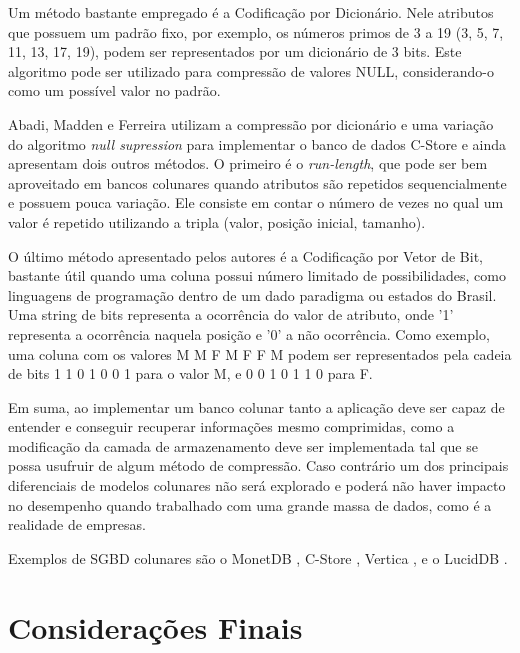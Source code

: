 Um método bastante empregado é a Codificação por Dicionário. Nele atributos que possuem um padrão fixo, por exemplo, os números primos de 
3 a 19 (3, 5, 7, 11, 13, 17, 19), podem ser representados por um dicionário de 3 bits. Este algoritmo pode ser utilizado para compressão 
de valores NULL, considerando-o como um possível valor no padrão.

Abadi, Madden e Ferreira \cite{abadi2006integrating} utilizam a compressão por dicionário e uma variação do algoritmo \textit{null supression} para implementar o banco de dados C-Store e ainda apresentam dois outros métodos. O primeiro é o \textit{run-length}, que pode ser bem aproveitado 
em bancos colunares quando atributos são repetidos sequencialmente e possuem pouca variação. Ele consiste em contar o número de vezes no qual 
um valor é repetido utilizando a tripla (valor, posição inicial, tamanho). 




O último método apresentado pelos autores é a Codificação por Vetor de Bit, bastante útil quando uma coluna possui número limitado 
de possibilidades, como linguagens de programação dentro de um dado paradigma ou estados do Brasil. Uma string de bits representa a 
ocorrência do valor de atributo, onde '1' representa a ocorrência naquela posição e '0' a não ocorrência. Como exemplo, uma coluna com os 
valores {M M F M F F M} podem ser representados pela cadeia de bits 1 1 0 1 0 0 1 para o valor M, e 0 0 1 0 1 1 0 para F.

Em suma, ao implementar um banco colunar tanto a aplicação deve ser capaz de entender e conseguir recuperar informações mesmo comprimidas, como a modificação da camada de armazenamento deve ser implementada tal que se possa usufruir de algum método de compressão. Caso contrário um 
dos principais diferenciais de modelos colunares não será explorado e poderá não haver impacto no desempenho quando trabalhado com uma 
grande massa de dados, como é a realidade de empresas.

Exemplos de SGBD colunares são o MonetDB \cite{monetdb2017c}, C-Store \cite{cstore2018nosql}, Vertica \cite{vertica2017c}, e o LucidDB \cite{lucid2018column}.
\section{Considerações Finais}

